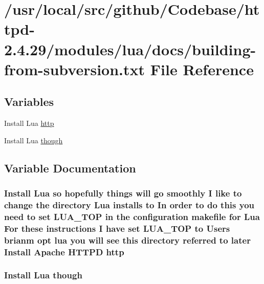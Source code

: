 \hypertarget{building-from-subversion_8txt}{}\section{/usr/local/src/github/\+Codebase/httpd-\/2.4.29/modules/lua/docs/building-\/from-\/subversion.txt File Reference}
\label{building-from-subversion_8txt}
\subsection*{Variables}
\begin{DoxyCompactItemize}
\item 
Install Lua \hyperlink{building-from-subversion_8txt_a196ae5ed254526b6586c4be9d93ef0a6}{http}
\item 
Install Lua \hyperlink{building-from-subversion_8txt_a75c94c8dc3daab4ef6a380ed1c36cd26}{though}
\end{DoxyCompactItemize}


\subsection{Variable Documentation}
\subsubsection[{\texorpdfstring{http}{http}}]{\setlength{\rightskip}{0pt plus 5cm}Install Lua {\bf so} hopefully things will go smoothly {\bf I} like {\bf to} change the {\bf directory} Lua installs {\bf to} In {\bf order} {\bf to} {\bf do} {\bf this} you need {\bf to} {\bf set} L\+U\+A\+\_\+\+T\+OP {\bf in} the configuration makefile for Lua For these {\bf instructions} {\bf I} have {\bf set} L\+U\+A\+\_\+\+T\+OP {\bf to} Users brianm {\bf opt} lua you will see {\bf this} {\bf directory} referred {\bf to} later Install Apache H\+T\+T\+PD http}\hypertarget{building-from-subversion_8txt_a196ae5ed254526b6586c4be9d93ef0a6}{}\label{building-from-subversion_8txt_a196ae5ed254526b6586c4be9d93ef0a6}
\subsubsection[{\texorpdfstring{though}{though}}]{\setlength{\rightskip}{0pt plus 5cm}Install Lua though}\hypertarget{building-from-subversion_8txt_a75c94c8dc3daab4ef6a380ed1c36cd26}{}\label{building-from-subversion_8txt_a75c94c8dc3daab4ef6a380ed1c36cd26}
